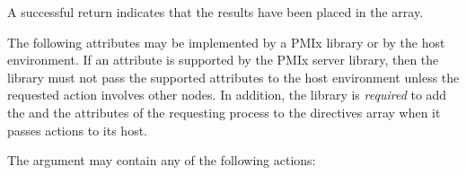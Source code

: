 \begin{arglist}
\end{arglist}

A successful return indicates that the results have been placed in the  array.

\returnsimple

\optattrstart
The following attributes may be implemented by a \ac{PMIx} library or by the host environment. If an attribute is supported by the \ac{PMIx} server library, then the library must not pass the supported attributes to the host environment unless the requested action involves other nodes. In addition, the library is \textit{required} to add the  and the  attributes of the requesting process to the directives array when it passes actions to its host.

The  argument may contain any of the following actions:

